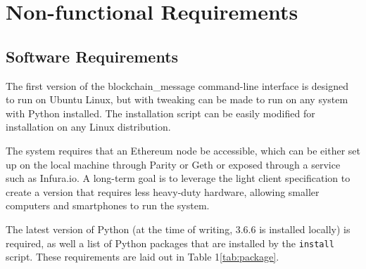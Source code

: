 \documentclass[titlepage]{report}
\begin{document}
\section{Non-functional Requirements}
\subsection{Software Requirements}
The first version of the blockchain\_message command-line interface is designed to run on Ubuntu Linux, but with tweaking can be made to run on any system with Python installed. The installation script can be easily modified for installation on any Linux distribution.

The system requires that an Ethereum \gls{node} be accessible, which can be either set up on the local machine through Parity or Geth or exposed through a service such as Infura.io. A long-term goal is to leverage the light client specification to create a version that requires less heavy-duty hardware, allowing smaller computers and smartphones to run the system.

The latest version of Python (at the time of writing, 3.6.6 is installed locally) is required, as well a list of Python packages that are installed by the \texttt{install} script. These requirements are laid out in Table 1\ref{tab:package}.
\end{document}
